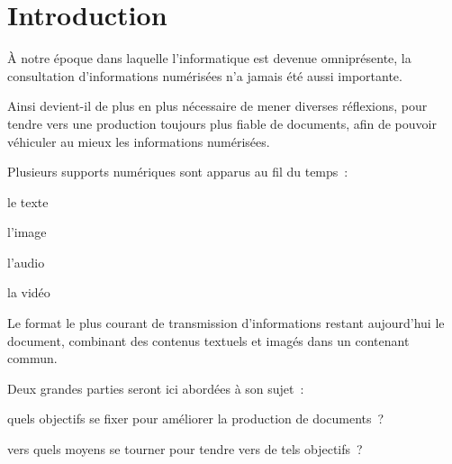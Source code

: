 \section{Introduction}

À notre époque dans laquelle l’informatique est devenue omniprésente,
la consultation d’informations numérisées n’a jamais été aussi importante.

Ainsi devient-il de plus en plus nécessaire de mener diverses réflexions,
pour tendre vers une production toujours plus fiable de documents,
afin de pouvoir véhiculer au mieux les informations numérisées.

Plusieurs supports numériques sont apparus au fil du temps :
\begin{itmz}
\item{le texte}
\item{l’image}
\item{l’audio}
\item{la vidéo}
\end{itmz}
Le format le plus courant de transmission d’informations restant aujourd’hui
le document, combinant des contenus textuels et imagés dans un contenant commun.

Deux grandes parties seront ici abordées à son sujet :
\begin{enum}
\item{quels objectifs se fixer pour améliorer la production de documents ?}
\item{vers quels moyens se tourner pour tendre vers de tels objectifs ?}
\end{enum}

\pagebreak
